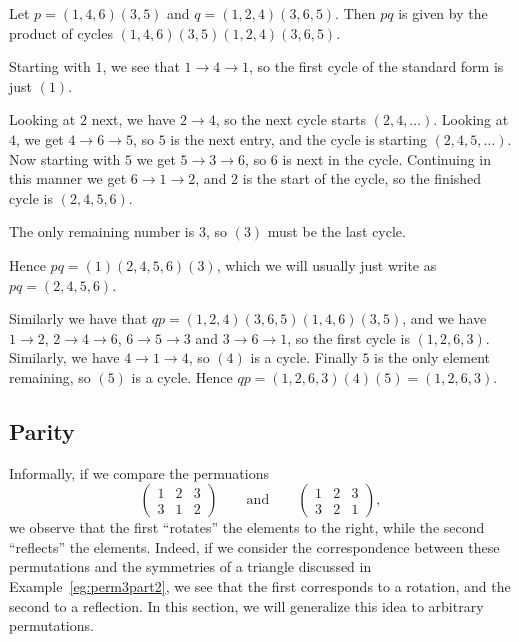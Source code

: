 \begin{example}
  Let $p = (1, 4, 6)(3, 5)$ and $q = (1, 2, 4)(3, 6, 5)$.  Then $pq$ is given
  by the product of cycles $(1, 4, 6)(3, 5)(1, 2, 4)(3, 6, 5)$.
  
  Starting with $1$, we see that $1 \to 4 \to 1$, so the first cycle of the
  standard form is just $(1)$.
  
  Looking at $2$ next, we have $2 \to 4$, so the next cycle
  starts $(2, 4, \ldots)$.  Looking at $4$, we get $4 \to 6 \to 5$, so $5$
  is the next entry, and the cycle is starting $(2, 4, 5, \ldots)$.
  Now starting with $5$ we get $5 \to 3 \to 6$, so $6$
  is next in the cycle.  Continuing in this manner we get $6 \to 1 \to 2$,
  and $2$ is the start of the cycle, so the finished cycle is $(2, 4, 5, 6)$.
  
  The only remaining number is $3$, so $(3)$ must be the last cycle.
  
  Hence $pq = (1)(2, 4, 5, 6)(3)$, which we will usually just write as
  $pq = (2, 4, 5, 6)$.
  
  Similarly we have that $qp = (1, 2, 4)(3, 6, 5)(1, 4, 6)(3, 5)$, and
  we have $1 \to 2$, $2 \to 4 \to 6$, $6 \to 5 \to 3$ and $3 \to 6 \to 1$,
  so the first cycle is $(1, 2, 6, 3)$.  Similarly, we have $4 \to 1 \to 4$,
  so $(4)$ is a cycle.  Finally $5$ is the only element remaining, so $(5)$
  is a cycle.  Hence $qp = (1, 2, 6, 3)(4)(5) = (1, 2, 6, 3)$.
\end{example}

\subsection{Parity}

Informally, if we compare the permuations
\[
  \begin{pmatrix}
    1 & 2 & 3\\
    3 & 1 & 2
  \end{pmatrix}
  \qquad \text{and} \qquad
  \begin{pmatrix}
    1 & 2 & 3\\
    3 & 2 & 1
  \end{pmatrix},
\]
we observe that the first ``rotates'' the elements to the right, while
the second ``reflects'' the elements.  Indeed, if we consider the
correspondence between these permutations and the symmetries of a triangle
discussed in Example~\ref{eg:perm3part2}, we see that the first corresponds
to a rotation, and the second to a reflection.  In this section, we will
generalize this idea to arbitrary permutations.

